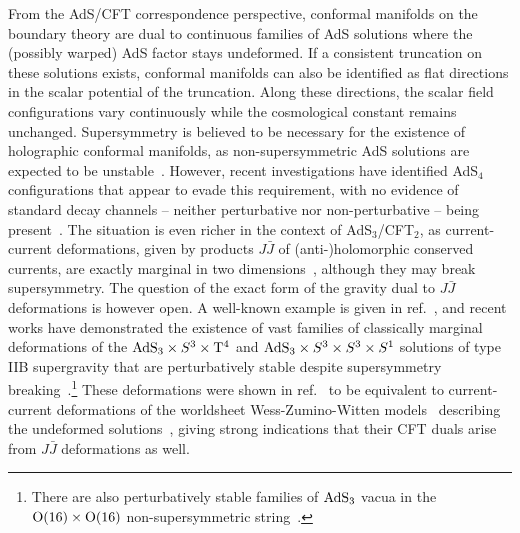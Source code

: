 \documentclass[11pt,a4paper]{article}
\begin{document}
From the AdS/CFT correspondence perspective, conformal manifolds on the boundary theory are dual to continuous families of AdS solutions where the (possibly warped) AdS factor stays undeformed. If a consistent truncation on these solutions exists, conformal manifolds can also be identified as flat directions in the scalar potential of the truncation. Along these directions, the scalar field configurations vary continuously while the cosmological constant remains unchanged. Supersymmetry is believed to be necessary for the existence of holographic conformal manifolds, as non-supersymmetric AdS solutions are expected to be unstable~\cite{Ooguri:2016pdq,Palti:2019pca}. However, recent investigations have identified AdS$_4$ configurations that appear to evade this requirement, with no evidence of standard decay channels -- neither perturbative nor non-perturbative -- being present~\cite{Giambrone:2021wsm}. The situation is even richer in the context of AdS$_3$/CFT$_2$, as current-current deformations, given by products $J\bar J$ of (anti-)holomorphic conserved currents, are exactly marginal in two dimensions~\cite{Chaudhuri:1988qb}, although they may break supersymmetry. The question of the exact form of the gravity dual to $J\bar J$ deformations is however open. A well-known example is given in ref.~\cite{Aharony:2001dp,Dong:2014tsa}, and recent works have demonstrated the existence of vast families of classically marginal deformations of the ${\rm AdS}_{3}\times S^{3}\times {\rm T}^{4}$ and ${\rm AdS}_{3}\times S^{3}\times S^{3}\times S^{1}$ solutions of type IIB supergravity that are perturbatively stable despite supersymmetry breaking~\cite{Eloy:2023zzh,Eloy:2023acy,Eloy:2024lwn}.\footnote{There are also perturbatively stable families of ${\rm AdS}_{3}$ vacua in the ${\rm O}(16)\times{\rm O}(16)$ non-supersymmetric string~\cite{Baykara:2022cwj,Fraiman:2023cpa,Robbins:2025wlm}.} These deformations were shown in ref.~\cite{Eloy:2024lwn} to be equivalent to current-current deformations of the worldsheet Wess-Zumino-Witten models~\cite{Gepner:1986wi} describing the undeformed solutions~\cite{Eberhardt:2017pty,Eberhardt:2018ouy}, giving strong indications that their CFT duals arise from $J\bar J$ deformations as well.
\end{document}
